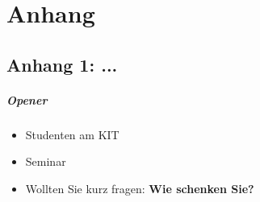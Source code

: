 \chapter{Anhang}
\label{chap:appendix}

\section{Anhang 1: ...}
\label{anhang:anhang1}
\paragraph{Opener}
\begin{itemize}
    \item Studenten am KIT
    \item Seminar
    \item Wollten Sie kurz fragen: \textbf{Wie schenken Sie?}
\end{itemize}